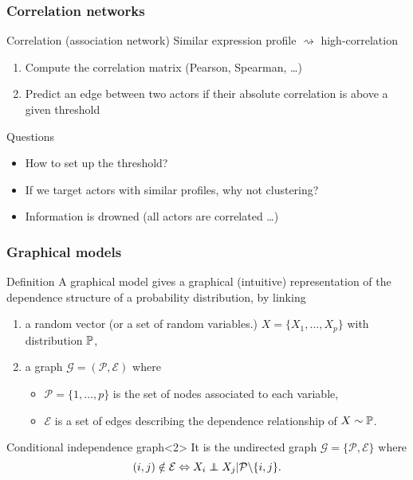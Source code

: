 \begin{frame}
  \frametitle{Correlation networks}

  \begin{block}{Correlation (association network)}
    Similar expression profile $\rightsquigarrow$ high-correlation
    \begin{enumerate}
    \item Compute the correlation matrix (Pearson, Spearman, \dots)
    \item Predict an edge between two actors if their absolute correlation is above a given threshold
    \end{enumerate}   
  \end{block}
  
  \vfill

  \begin{block}{Questions}
    \begin{itemize}
    \item How to set up the threshold?
    \item If we target actors with similar profiles, why not clustering?
    \item Information is drowned (all actors are correlated \dots)
    \end{itemize}
    
  \end{block}
\end{frame}

\begin{frame}
  \frametitle{Graphical models}
  \begin{block}{Definition}
    A graphical model gives  a graphical (intuitive) representation of
    the dependence structure of a probability distribution, by linking
    
    \begin{enumerate}
    \item a random  vector (or a set of random  variables.)  $X = \{X_1,
      \dots, X_p\}$ with distribution $\mathbb{P}$, \bigskip
    \item a graph $\mathcal{G} = (\mathcal{P}, \mathcal{E})$ where
      \begin{itemize}
      \item $\mathcal{P}=\{1,\dots,p\}$ is  the set of nodes associated
        to each variable,
      \item $\mathcal{E}$ is a  set of edges describing the dependence
        relationship of $X\sim \mathbb{P}$.
      \end{itemize}
    \end{enumerate}
   \end{block}

   \vfill

  \begin{block}{Conditional independence graph}<2> It is the \alert{undirected}  graph $\mathcal{G} =
    \{\mathcal{P},    \mathcal{E}\}$ where
    \begin{equation*}
      (i,j) \notin \mathcal{E} \Leftrightarrow X_i \indep X_j | \mathcal{P} \backslash
      \{i,j\}.
    \end{equation*}
  \end{block}

\end{frame}

